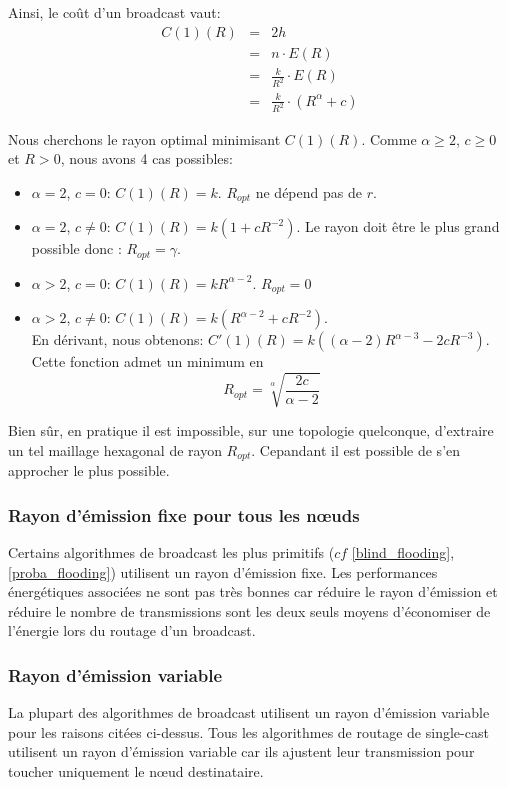 Ainsi, le coût d'un broadcast vaut:
\begin{eqnarray*}
C(1)(R) & = & 2h \label{eq:3}\\
 & = & n\cdot E(R)\\
 & = & \frac{k}{R^2}\cdot E(R)\\
 & = &  \frac{k}{R^2}\cdot (R^\alpha+c) \label{eq:4}
\end{eqnarray*}
 
Nous cherchons le rayon optimal minimisant $C(1)(R)$. Comme $\alpha\geq 2$, $c\geq 0$ et $R>0$, nous avons 4 cas possibles:
\begin{itemize}
 \item $\alpha=2$, $c=0$:  $C(1)(R)=k$. $R_{opt}$ ne dépend pas de $r$.
 \item $\alpha=2$, $c\neq0$: $C(1)(R)=k(1+cR^{-2})$. Le rayon doit être le plus grand possible donc : $R_{opt}=\gamma$.
 \item $\alpha>2$, $c=0$: $C(1)(R)=kR^{\alpha-2}$. $R_{opt}=0$
 \item $\alpha>2$, $c\neq 0$: $C(1)(R)=k(R^{\alpha-2} + c R^{-2} ) $.\\
 En dérivant, nous obtenons: $C'(1)(R)= k( (\alpha-2) R^{\alpha-3}- 2cR^{-3} ) $.\\
Cette fonction admet un minimum en $$R_{opt}=\sqrt[\alpha]{\frac{2c}{\alpha-2}}$$
\end{itemize}

Bien sûr, en pratique il est impossible, sur une topologie quelconque, d'extraire un tel maillage hexagonal de rayon $R_{opt}$. Cepandant il est possible de s'en approcher le plus possible.


\subsubsection{Rayon d'émission fixe pour tous les nœuds}
Certains algorithmes de broadcast les plus primitifs ($cf$ \ref{blind_flooding}, \ref{proba_flooding}) utilisent un rayon d'émission fixe. Les performances énergétiques associées ne sont pas très bonnes car réduire le rayon d'émission et réduire le nombre de transmissions sont les deux seuls moyens d'économiser de l'énergie lors du routage d'un broadcast.


\subsubsection{Rayon d'émission variable}
La plupart des algorithmes  de broadcast utilisent un rayon d'émission variable pour les raisons citées ci-dessus. Tous les algorithmes de routage de single-cast utilisent un rayon d'émission variable car ils ajustent leur transmission pour toucher uniquement le nœud destinataire.



